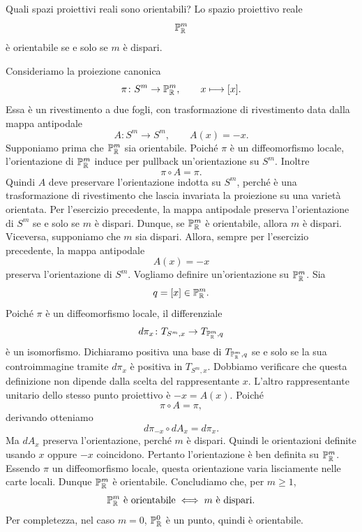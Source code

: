 \documentclass[a4paper]{article}
\begin{document}
\begin{snippetproposition}{Quali spazi proiettivi reali sono orientabili?}
    Lo spazio proiettivo reale
    \[
        \mathbb{P}^m_{\mathbb{R}}
    \]
    è orientabile se e solo se \(m\) è dispari.
\end{snippetproposition}

\begin{snippetproof}{}
    Consideriamo la proiezione canonica
    \[
        \pi\colon S^m\to\mathbb{P}^m_{\mathbb{R}},
        \qquad
        x\longmapsto [x].
    \]
    Essa è un rivestimento a due fogli, con trasformazione di rivestimento data dalla mappa antipodale
    \[
        A\colon S^m\to S^m,
        \qquad
        A(x)=-x.
    \]
    Supponiamo prima che \(\mathbb{P}^m_{\mathbb{R}}\) sia orientabile. Poiché \(\pi\) è un diffeomorfismo locale, l'orientazione di \(\mathbb{P}^m_{\mathbb{R}}\) induce per pullback un'orientazione su \(S^m\). Inoltre
    \[
        \pi\circ A=\pi.
    \]
    Quindi \(A\) deve preservare l'orientazione indotta su \(S^m\), perché è una trasformazione di rivestimento che lascia invariata la proiezione su una varietà orientata. Per l'esercizio precedente, la mappa antipodale preserva l'orientazione di \(S^m\) se e solo se \(m\) è dispari. Dunque, se \(\mathbb{P}^m_{\mathbb{R}}\) è orientabile, allora \(m\) è dispari.
    Viceversa, supponiamo che \(m\) sia dispari. Allora, sempre per l'esercizio precedente, la mappa antipodale
    \[
        A(x)=-x
    \]
    preserva l'orientazione di \(S^m\). Vogliamo definire un'orientazione su \(\mathbb{P}^m_{\mathbb{R}}\). Sia
    \[
        q=[x]\in\mathbb{P}^m_{\mathbb{R}}.
    \]
    Poiché \(\pi\) è un diffeomorfismo locale, il differenziale
    \[
        d\pi_x\colon T_{S^m,x}\to T_{\mathbb{P}^m_{\mathbb{R}},q}
    \]
    è un isomorfismo. Dichiaramo positiva una base di \(T_{\mathbb{P}^m_{\mathbb{R}},q}\) se e solo se la sua controimmagine tramite \(d\pi_x\) è positiva in \(T_{S^m,x}\).
    Dobbiamo verificare che questa definizione non dipende dalla scelta del rappresentante \(x\). L'altro rappresentante unitario dello stesso punto proiettivo è \(-x=A(x)\). Poiché
    \[
        \pi\circ A=\pi,
    \]
    derivando otteniamo
    \[
        d\pi_{-x}\circ dA_x=d\pi_x.
    \]
    Ma \(dA_x\) preserva l'orientazione, perché \(m\) è dispari. Quindi le orientazioni definite usando \(x\) oppure \(-x\) coincidono. Pertanto l'orientazione è ben definita su \(\mathbb{P}^m_{\mathbb{R}}\).
    Essendo \(\pi\) un diffeomorfismo locale, questa orientazione varia lisciamente nelle carte locali. Dunque \(\mathbb{P}^m_{\mathbb{R}}\) è orientabile.
    Concludiamo che, per \(m\geq1\),
    \[
        \mathbb{P}^m_{\mathbb{R}}
        \text{ è orientabile}
        \iff
        m \text{ è dispari}.
    \]
    Per completezza, nel caso \(m=0\), \(\mathbb{P}^0_{\mathbb{R}}\) è un punto, quindi è orientabile.
\end{snippetproof}
\end{document}
